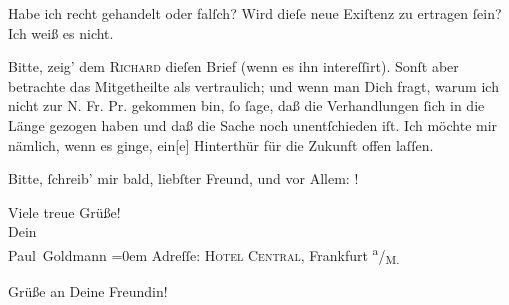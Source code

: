 \pstart
           Habe ich recht gehandelt oder falſch? Wird  dieſe neue Exiſtenz zu
               ertragen{ }ſein? Ich weiß es nicht.\pend
           
\pstart
           Bitte, zeig’ dem \textsc{Richard} dieſen Brief (wenn es ihn intereſſirt). Sonſt aber betrachte das Mitgetheilte
               als vertraulich; und wenn man  Dich fragt, warum ich
               nicht zur N. Fr. Pr. gekommen bin,{ }ſo ſage, daß die Verhandlungen{ }ſich in die Länge gezogen haben und daß die Sache noch unentſchieden iſt. Ich möchte
               mir nämlich, wenn es ginge, ein{[}e{]} Hinterthür für die Zukunft
               offen laſſen.\pend
           
\pstart
           Bitte,{ }ſchreib’ mir bald, liebſter Freund, und vor Allem: \label{K_L02868-10v}\label{K_L02868-10}!\pend
           
\pstart
           Viele treue Grüße! {\\[\baselineskip]}Dein {\\[\baselineskip]}\spacefill\mbox{Paul Goldmann}\pend
           \leftskip=0em{}
\pstart
           \noindent{}Adreſſe: \textsc{Hotel Central}, Frankfurt \textsuperscript{a}/\textsubscript{M.}\pend
           
\pstart
           Grüße an Deine Freundin!\pend
           \endnumbering{}  \newcommand{\dateiname}{L02868}\newcommand{\titel}{Paul Goldmann an Arthur Schnitzler, 5. 3. [1899]}\newcommand{\editorInnen}{Martin Anton Müller und Laura Untner}
